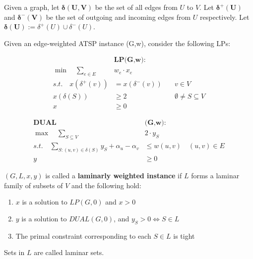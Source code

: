 \documentclass[./main.tex]{subfiles}
\begin{document}
\begin{definition} 
	Given a graph, let $\bm{\delta(U,V)}$ be the set of all edges from $U$ to $V$. 
	Let $\bm{\delta^+(U)}$ and $\bm{\delta^-(V)}$ be the set of outgoing and incoming edges from $U$ respectively. 
	Let $\bm{\delta(U)}:=\delta^+(U)\cup \delta^-(U)$.
\end{definition}\vspace{4mm}

\begin{definition} 
	Given an edge-weighted ATSP instance (G,w), consider the following LPs:\\
	\begin{minipage}{0.20\textwidth}
		\begin{align*}
			&\textbf{LP(G,w):}\\
			\min\quad\sum_{e\in E}&w_e\cdot x_e\\
			s.t.\quad x(\delta^+(v)) & = x(\delta^-(v))\quad & v\in V                     \\
			x(\delta(S))             & \geq 2\quad           & \emptyset\neq S\subseteq V \\
			x&\geq 0
		\end{align*}
	\end{minipage}
	\hfill\vline\hfill
	\begin{minipage}{0.55\textwidth}
		\begin{align*}
			\textbf{DUAL}                                                 & \textbf{(G,w):}             \\
			\max\quad\sum_{S\subseteq V}                                  & 2\cdot y_S                  \\
			s.t.\quad\sum_{S:(u,v)\in \delta(S)}y_S + \alpha_u - \alpha_v & \leq w(u,v)\quad (u,v)\in E \\
			y                                                             & \geq 0
		\end{align*}
	\end{minipage}
	\vspace{7mm}
\end{definition}

\begin{definition} 
	$(G,L,x,y)$ is called a \textbf{laminarly weighted instance} if $L$ forms a laminar family of subsets of $V$ and the following hold:
	\begin{enumerate}
		\item $x$ is a solution to $LP(G,0)$ and $x > 0$
		\item $y$ is a solution to $DUAL(G,0)$, and $y_S>0\iff S\in L$
		\item The primal constraint corresponding to each $S\in L$ is tight
	\end{enumerate}
	Sets in $L$ are called laminar sets.
\end{definition}\vspace{4mm}
\end{document}
